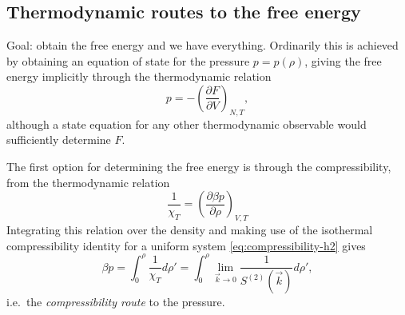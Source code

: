 \subsection{Thermodynamic routes to the free energy}

Goal: obtain the free energy and we have everything.
Ordinarily this is achieved by obtaining an equation of state for the pressure $p = p(\rho)$, giving the free energy implicitly through the thermodynamic relation
\begin{equation}\label{eq:pressure-relation-1}
  p
  =
  - \left( \frac{\partial F}{\partial V} \right)_{N,T},
\end{equation}
although a state equation for any other thermodynamic observable would sufficiently determine $F$.

The first option for determining the free energy is through the compressibility, from the thermodynamic relation
\begin{equation}
  \frac{1}{\chi_T}
  =
  \left( \frac{\partial \beta p}{\partial \rho} \right)_{V,T}
\end{equation}
Integrating this relation over the density and making use of the isothermal compressibility identity for a uniform system \eqref{eq:compressibility-h2} gives
\begin{equation}\label{eq:compressibility-route}
  \beta p
  =
  \int_0^\rho \frac{1}{\chi_T} d\rho'
  =
  \int_0^\rho \lim_{\vec{k} \to 0} \frac{1}{S^{(2)}(\vec{k})} d\rho',
\end{equation}
i.e.\ the \emph{compressibility route} to the pressure.

